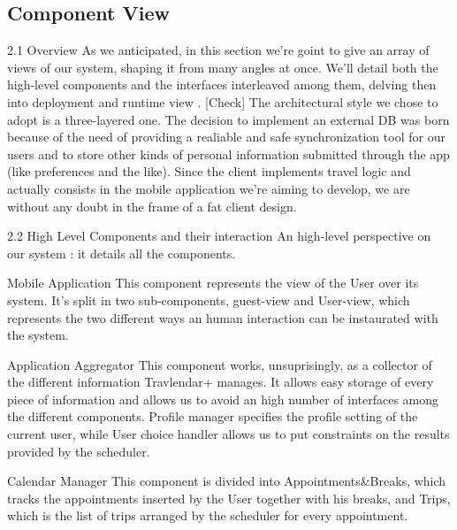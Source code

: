 \subsection{Component View}

2.1 Overview
As we anticipated, in this section we’re goint to give an array of views of our system, shaping it from many angles at once. We’ll detail both the high-level components and the interfaces interleaved among them, delving then into deployment and runtime view .
[Check] The architectural style we chose to adopt is a three-layered one.
The decision to implement an external DB was born because of the need of providing a realiable and safe synchronization tool for our users and to store other kinds of personal information submitted through the app (like preferences and the like).
Since the client implements travel logic and actually consists in the mobile application we’re aiming to develop, we are without any doubt in the frame of a fat client design.


2.2 High Level Components and their interaction
An high-level perspective on our system : it details all the components.


Mobile Application
This component represents the view of the User over its system. It’s split in two sub-components, guest-view and User-view, which represents the two different ways an human interaction can be instaurated with the system.

Application Aggregator
This component works, unsuprisingly, as a collector of the different information Travlendar+ manages. It allows easy storage of every piece of information and allows us to avoid an high number of interfaces among the different components. Profile manager specifies the profile setting of the current user, while User choice handler allows us to put constraints on the results provided by the scheduler.
 
Calendar Manager
This component is divided into Appointments&Breaks, which tracks the appointments inserted by the User together with his breaks, and Trips, which is the list of trips arranged by the scheduler for every appointment.


 

